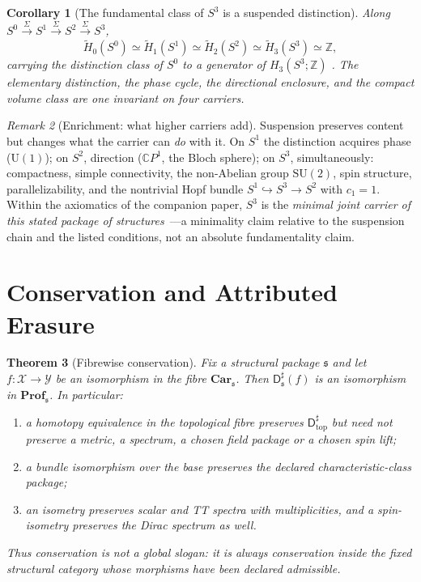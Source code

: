 \documentclass[11pt,a4paper]{article}
\newtheorem{theorem}{Theorem}[section]
\newtheorem{corollary}[theorem]{Corollary}
\theoremstyle{definition}
\theoremstyle{remark}
\newtheorem{remark}[theorem]{Remark}
\newcommand{\Szero}{S^{0}}
\newcommand{\Sone}{S^{1}}
\newcommand{\Stwo}{S^{2}}
\newcommand{\Sthree}{S^{3}}
\newcommand{\Z}{\mathbb{Z}}
\newcommand{\CP}{\mathbb{C}P}
\newcommand{\SU}{\mathrm{SU}}
\newcommand{\U}{\mathrm{U}}
\newcommand{\rH}{\widetilde H}
\newcommand{\Dsharp}{\mathsf{D}^{\sharp}}
\newcommand{\Dtop}{\mathsf{D}^{\sharp}_{\mathrm{top}}}
\newcommand{\Car}{\mathbf{Car}}
\begin{document}
\begin{corollary}[The fundamental class of $\Sthree$ is a suspended distinction]
\label{cor:s3class}
Along $\Szero\xrightarrow{\Sigma}\Sone\xrightarrow{\Sigma}\Stwo\xrightarrow{\Sigma}\Sthree$,
\begin{equation}
\rH_{0}(\Szero)\simeq\rH_{1}(\Sone)\simeq\rH_{2}(\Stwo)\simeq\rH_{3}(\Sthree)\simeq\Z ,
\end{equation}
carrying the distinction class of $\Szero$ to a generator of $H_{3}(\Sthree;\Z)$
\cite{PB2026susp}.  The elementary distinction, the phase cycle, the directional enclosure, and
the compact volume class are one invariant on four carriers.
\end{corollary}

\begin{remark}[Enrichment: what higher carriers add]
Suspension preserves content but changes what the carrier can \emph{do} with it.  On $\Sone$
the distinction acquires phase ($\U(1)$); on $\Stwo$, direction ($\CP^{1}$, the Bloch sphere);
on $\Sthree$, simultaneously: compactness, simple connectivity, the non-Abelian group
$\SU(2)$, spin structure, parallelizability, and the nontrivial Hopf bundle
$\Sone\hookrightarrow\Sthree\to\Stwo$ with $c_{1}=1$.  Within the axiomatics of the companion
paper, $\Sthree$ is the \emph{minimal joint carrier of this stated package of
structures}~\cite{PB2026susp}---a minimality claim relative to the suspension chain and the
listed conditions, not an absolute fundamentality claim.
\end{remark}

\section{Conservation and Attributed Erasure}
\label{sec:theorems}

\begin{theorem}[Fibrewise conservation]
\label{thm:conservation}
Fix a structural package $\mathfrak s$ and let
$f:\mathcal X\to\mathcal Y$ be an isomorphism in the fibre $\Car_{\mathfrak s}$.  Then
$\Dsharp_{\mathfrak s}(f)$ is an isomorphism in $\mathbf{Prof}_{\mathfrak s}$.  In particular:
\begin{enumerate}[label=(\roman*)]
\item a homotopy equivalence in the topological fibre preserves $\Dtop$ but need not preserve a
metric, a spectrum, a chosen field package or a chosen spin lift;
\item a bundle isomorphism over the base preserves the declared characteristic-class package;
\item an isometry preserves scalar and TT spectra with multiplicities, and a spin-isometry
preserves the Dirac spectrum as well.
\end{enumerate}
Thus conservation is not a global slogan: it is always conservation inside the fixed structural
category whose morphisms have been declared admissible.
\end{theorem}
\end{document}
